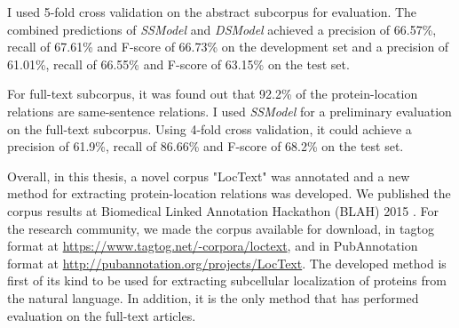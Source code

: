 I used 5-fold cross validation on the abstract subcorpus for evaluation. The combined predictions of \textit{SSModel} and \textit{DSModel} achieved a precision of 66.57\%, recall of 67.61\% and F-score of 66.73\% on the development set and a precision of 61.01\%, recall of 66.55\% and F-score of 63.15\% on the test set.

For full-text subcorpus, it was found out that 92.2\% of the protein-location relations are same-sentence relations. I used \textit{SSModel} for a preliminary evaluation on the full-text subcorpus. Using 4-fold cross validation, it could achieve a precision of 61.9\%, recall of 86.66\% and F-score of 68.2\% on the test set.

Overall, in this thesis, a novel corpus "LocText" was annotated and a new method for extracting protein-location relations was developed. We published the corpus results \cite{goldberg2015linked} at Biomedical Linked Annotation Hackathon (BLAH) 2015 \cite{blah}. For the research community, we made the corpus available for download, in tagtog format at \url{https://www.tagtog.net/-corpora/loctext}, and in PubAnnotation format at \url{http://pubannotation.org/projects/LocText}. The developed method is first of its kind to be used for extracting subcellular localization of proteins from the natural language. In addition, it is the only method that has performed evaluation on the full-text articles.

